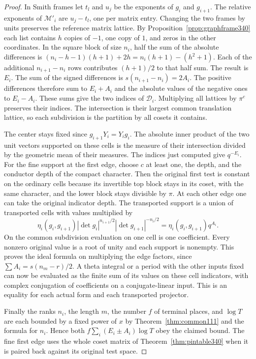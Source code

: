 \documentclass[a4paper,11pt]{article}
\theoremstyle{definition}
\theoremstyle{remark}
\numberwithin{equation}{section}
\begin{document}
\begin{proof}
In Smith frames let $t_l$ and $u_j$ be the exponents of $g_i$ and
$g_{i+1}$. The relative exponents of $\mathcal M'_i$ are $u_j-t_l$,
one per matrix entry. Changing the two frames by units preserves the
reference matrix lattice. By Proposition~\ref{prop:graphframe340}
each list contains $h$ copies of $-1$, one copy of $1$, and zeros
in the other coordinates. In the square block of size $n_i$,
half the sum of the absolute differences is
$(n_i-h-1)(h+1)+2h=n_i(h+1)-(h^2+1)$. Each of the additional
$n_{i+1}-n_i$ rows contributes $(h+1)/2$ to that half sum.
The result is $E_i$. The sum of the signed differences is
$s(n_{i+1}-n_i)=2A_i$. The positive differences therefore sum
to $E_i+A_i$ and the absolute values of the negative ones to
$E_i-A_i$. These sums give the two indices of $\mathcal D_i$.
Multiplying all lattices by $\pi^c$ preserves their indices. The
intersection is their largest common translation lattice, so each
subdivision is the partition by all cosets it contains.

The center stays fixed since $g_{i+1}Y_i=Y_i g_i$. The absolute
inner product of the two unit vectors supported on these cells is
the measure of their intersection divided by the geometric mean of
their measures. The indices just computed give $q^{-E_i}$.
For the fine support at the first edge, choose $c$ at least one,
the depth, and the conductor depth of the compact character.
Then the original first test is constant on the ordinary cells because its
invertible top block stays in its coset, with the same character,
and the lower block stays divisible by $\pi$. At each other edge
one can take the original indicator depth. The transported support
is a union of transported cells with values multiplied by
\[
 \eta_i(g_i,g_{i+1})|\det g_i|^{n_{i+1}/2}
                    |\det g_{i+1}|^{-n_i/2}
               =\eta_i(g_i,g_{i+1})q^{A_i}.
\]
On the common subdivision evaluation on one cell is one coefficient.
Every nonzero original value is a root of unity and each support is
nonempty. This proves the ideal formula on multiplying the edge
factors, since $\sum A_i=s(n_m-r)/2$. A theta integral or a period
with the other inputs fixed can now be evaluated as the finite sum
of its values on these cell indicators, with complex conjugation
of coefficients on a conjugate-linear input. This is an equality
for each actual form and each transported projector.

Finally the ranks $n_i$, the length $m$, the number $f$ of terminal
places, and $\log T$ are each bounded by a fixed power of $x$ by
Theorem~\ref{thm:common111} and the formula for $n_i$. Hence both
$f\sum_i(E_i\pm A_i)\log T$ obey the claimed bound. The fine first
edge uses the whole coset matrix of Theorem~\ref{thm:pintable340}
when it is paired back against its original test space.
\end{proof}
\end{document}
